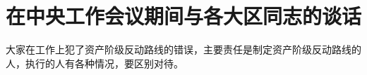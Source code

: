 \section[在中央工作会议期间与各大区同志的谈话（一九六六年十月）]{在中央工作会议期间与各大区同志的谈话}


大家在工作上犯了资产阶级反动路线的错误，主要责任是制定资产阶级反动路线的人，执行的人有各种情况，要区别对待。



